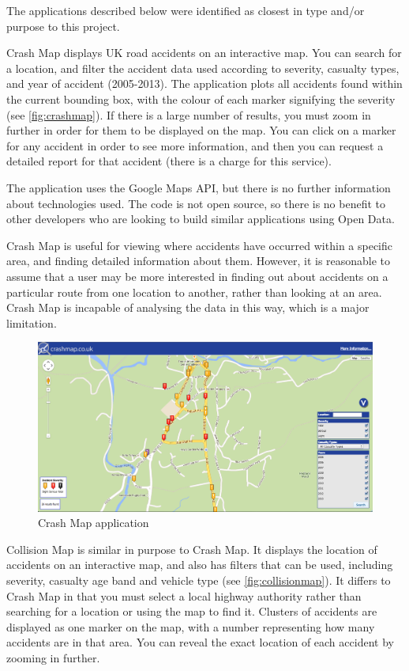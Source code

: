 \documentclass[authoryearcitations]{UoYCSproject}
\begin{document}
The applications described below were identified as closest in type and/or purpose to this project.
 
Crash Map \citep{crashmap} displays UK road accidents on an interactive map. You can search for a location, and filter the accident data used according to severity, casualty types, and year of accident (2005-2013). The application plots all accidents found within the current bounding box, with the colour of each marker signifying the severity (see \autoref{fig:crashmap}). If there is a large number of results, you must zoom in further in order for them to be displayed on the map. You can click on a marker for any accident in order to see more information, and then you can request a detailed report for that accident (there is a charge for this service).

The application uses the Google Maps API, but there is no further information about technologies used. The code is not open source, so there is no benefit to other developers who are looking to build similar applications using Open Data. 

Crash Map is useful for viewing where accidents have occurred within a specific area, and finding detailed information about them. However, it is reasonable to assume that a user may be more interested in finding out about accidents on a particular route from one location to another, rather than looking at an area. Crash Map is incapable of analysing the data in this way, which is a major limitation.

\begin{figure}
	\includegraphics[scale=0.3]{crashmap}
	\caption{Crash Map application}
	\label{fig:crashmap}
\end{figure}

Collision Map \citep{DepartmentforTransport} is similar in purpose to Crash Map. It displays the location of accidents on an interactive map, and also has filters that can be used, including severity, casualty age band and vehicle type (see \autoref{fig:collisionmap}). It differs to Crash Map in that you must select a local highway authority rather than searching for a location or using the map to find it. Clusters of accidents are displayed as one marker on the map, with a number representing how many accidents are in that area. You can reveal the exact location of each accident by zooming in further.
\end{document}
